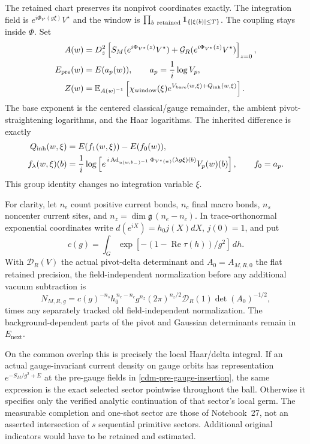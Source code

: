 \documentclass[11pt]{article}
\theoremstyle{remark}
\begin{document}
The retained chart preserves its nonpivot coordinates exactly.
The integration field is $e^{i\Phi_{V^\star}(g\xi)}V^\star$ and
the window is
$\prod_{b\ {\rm retained}}\mathbf1_{\{|\xi(b)|\le T\}}$.
The coupling stays inside $\Phi$. Set
\begin{align}
 A(w)&=
 D_z^2\left[
 S_M(e^{i\Phi_{V^\star}(z)}V^\star)
 +\mathcal G_R(e^{i\Phi_{V^\star}(z)}V^\star)\right]_{z=0},
 \notag\\
 E_{\mathrm{pre}}(w)&=E(a_p(w)),\qquad a_p=\frac1i\log V_p,
 \notag\\
 Z(w)&=\mathbb E_{A(w)^{-1}}\left[
 \chi_{\mathrm{window}}(\xi)
 e^{V_{\mathrm{base}}(w,\xi)+Q_{\mathrm{inh}}(w,\xi)}
 \right].
 \label{cdm-integral-parts}
\end{align}
The base exponent is the centered classical/gauge remainder,
the ambient pivot-straightening logarithms, and the Haar
logarithms. The inherited difference is exactly
\begin{align}
 Q_{\mathrm{inh}}(w,\xi)&=E(f_1(w,\xi))-E(f_0(w)),\notag\\
 f_\lambda(w,\xi)(b)&=
 \frac1i\log\left[
 e^{\,i\operatorname{Ad}_{u(w;b_-)^{-1}}
                \Phi_{V^\star(w)}(\lambda g\xi)(b)}
 V_p(w)(b)\right],\qquad f_0=a_p.
 \label{cdm-pre-gauge-insertion}
\end{align}
This group identity changes no integration variable $\xi$.

For clarity, let $n_e$ count positive current bonds, $n_c$ final
macro bonds, $n_s$ noncenter current sites, and
$n_z=\dim\mathfrak g\,(n_e-n_c)$. In trace-orthonormal exponential
coordinates write $d(e^{iX})=h_0j(X)dX$, $j(0)=1$, and put
\[
 c(g)=\int_G
 \exp[-(1-\operatorname{Re}\tau(h))/g^2]\,dh.
\]
With $\mathcal D_R(V)$ the actual pivot-delta determinant and
$A_0=A_{M,R,0}$ the flat retained precision, the field-independent
normalization before any additional vacuum subtraction is
\begin{equation}
 N_{M,R,g}=
 c(g)^{-n_s}h_0^{\,n_e-n_c}g^{n_z}(2\pi)^{n_z/2}
       \mathcal D_R(1)\det(A_0)^{-1/2},
 \label{cdm-normalization}
\end{equation}
times any separately tracked old field-independent normalization.
The background-dependent parts of the pivot and Gaussian
determinants remain in $E_{\mathrm{next}}$.

On the common overlap this is precisely the local Haar/delta
integral. If an actual gauge-invariant current density on gauge
orbits has representation $e^{-S_M/g^2+E}$ at the pre-gauge
fields in \eqref{cdm-pre-gauge-insertion}, the same expression
is the exact selected sector pointwise throughout the ball.
Otherwise it specifies only the verified analytic continuation
of that sector's local germ. The measurable completion and
one-shot sector are those of Notebook~27, not an asserted
intersection of $s$ sequential primitive sectors. Additional
original indicators would have to be retained and estimated.
\end{document}
